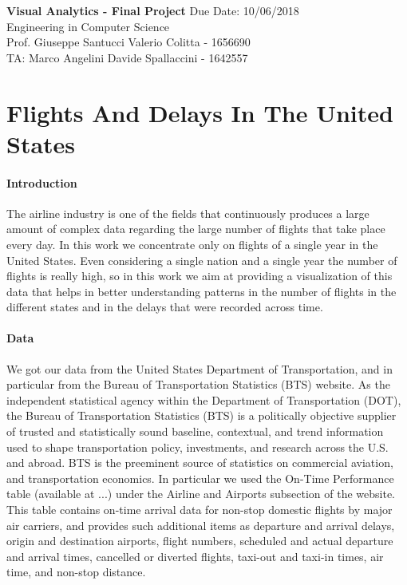 \documentclass[a4paper, 12pt]{article}
\begin{document}
\noindent
\large\textbf{Visual Analytics - Final Project} \normalsize \hfill Due Date: 10/06/2018 \\
\normalsize Engineering in Computer Science   \\
Prof. Giuseppe Santucci \hfill Valerio Colitta - 1656690 \\
TA: Marco Angelini \hfill Davide Spallaccini - 1642557

\section*{Flights And Delays In The United States}

\paragraph{Introduction}
The airline industry is one of the fields that continuously produces a large amount of complex data
regarding the large number of flights that take place every day. In this work we concentrate only on
flights of a single year in the United States. Even considering a single nation and a single year the
number of flights is really high, so in this work we aim at providing a visualization of this data that
helps in better understanding patterns in the number of flights in the different states and in the 
delays that were recorded across time.

\paragraph*{Data}
We got our data from the United States Department of Transportation, and in particular from the 
Bureau of Transportation Statistics (BTS) website. As the independent statistical agency within the
Department of Transportation (DOT), the Bureau of Transportation Statistics (BTS) is a politically
objective supplier of trusted and statistically sound baseline, contextual, and trend information used
to shape transportation policy, investments, and research across the U.S. and abroad. BTS is the
preeminent source of statistics on commercial aviation, and transportation economics.
In particular we used the On-Time Performance table (available at ...) under the Airline and Airports
subsection of the website. This table contains on-time arrival data for non-stop domestic flights by
major air carriers, and provides such additional items as departure and arrival delays, origin and
destination airports, flight numbers, scheduled and actual departure and arrival times, cancelled or
diverted flights, taxi-out and taxi-in times, air time, and non-stop distance.
\end{document}
